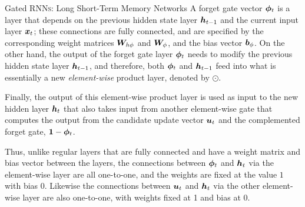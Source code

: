 %
%
%
\begin{frame}{Gated RNN\textsc{s}: Long Short-Term Memory Networks}
A forget gate vector ${\bm \phi}_t$ is a layer that
depends on the previous hidden state layer ${\boldsymbol h}_{t-1}$ and 
the current input layer ${\boldsymbol x}_t$;
these connections are fully connected, and are specified by the
corresponding weight matrices ${\boldsymbol W}_{h\phi}$ and ${\boldsymbol W}_{\phi}$, 
and the bias vector ${\boldsymbol b}_\phi$. On the other hand, the output of the
forget gate layer ${\bm \phi}_t$ 
needs to modify the previous hidden state layer ${\boldsymbol h}_{t-1}$, and
therefore, both ${\bm \phi}_t$ and ${\boldsymbol h}_{t-1}$ feed into what is essentially a new {\em
element-wise} product layer, denoted by $\odot$.%

\medskip


Finally, the output of this element-wise
product layer is used as input to the new hidden layer ${\boldsymbol h}_t$ that
also takes input from another element-wise gate that computes the output
from the candidate update vector ${\boldsymbol u}_t$ and the complemented forget
gate, $\mathbf{1}-{\bm \phi}_t$.


\medskip

Thus, unlike regular layers
that are fully connected and have a weight matrix and bias vector
between the layers, the connections between ${\bm \phi}_t$ and ${\boldsymbol h}_t$ via
the element-wise layer are all
one-to-one, and the weights are fixed at the value $1$ with bias
$0$. Likewise the connections between ${\boldsymbol u}_t$ and ${\boldsymbol h}_{t}$ via the
other element-wise layer are also one-to-one, with weights fixed at 1 and
bias at 0.
\end{frame}
%
